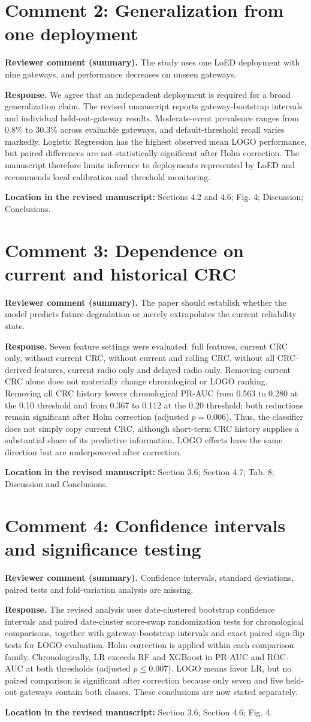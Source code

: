 \documentclass[11pt]{article}
\newcommand{\ReviewerComment}[1]{\par\noindent\textcolor{reviewblue}{\textbf{Reviewer comment (summary).}} #1\par}
\newcommand{\AuthorResponse}[1]{\par\noindent\textcolor{responsegreen}{\textbf{Response.}} #1\par}
\newcommand{\Location}[1]{\par\noindent\textbf{Location in the revised manuscript:} #1\par}
\begin{document}
\section*{Comment 2: Generalization from one deployment}
\ReviewerComment{The study uses one LoED deployment with nine gateways, and performance decreases on unseen gateways.}
\AuthorResponse{We agree that an independent deployment is required for a broad generalization claim. The revised manuscript reports gateway-bootstrap intervals and individual held-out-gateway results. Moderate-event prevalence ranges from 0.8\% to 30.3\% across evaluable gateways, and default-threshold recall varies markedly. Logistic Regression has the highest observed mean LOGO performance, but paired differences are not statistically significant after Holm correction. The manuscript therefore limits inference to deployments represented by LoED and recommends local calibration and threshold monitoring.}
\Location{Sections 4.2 and 4.6; Fig. 4; Discussion; Conclusions.}

\section*{Comment 3: Dependence on current and historical CRC}
\ReviewerComment{The paper should establish whether the model predicts future degradation or merely extrapolates the current reliability state.}
\AuthorResponse{Seven feature settings were evaluated: full features, current CRC only, without current CRC, without current and rolling CRC, without all CRC-derived features, current radio only and delayed radio only. Removing current CRC alone does not materially change chronological or LOGO ranking. Removing all CRC history lowers chronological PR-AUC from 0.563 to 0.280 at the 0.10 threshold and from 0.367 to 0.112 at the 0.20 threshold; both reductions remain significant after Holm correction (adjusted $p=0.006$). Thus, the classifier does not simply copy current CRC, although short-term CRC history supplies a substantial share of its predictive information. LOGO effects have the same direction but are underpowered after correction.}
\Location{Section 3.6; Section 4.7; Tab. 8; Discussion and Conclusions.}

\section*{Comment 4: Confidence intervals and significance testing}
\ReviewerComment{Confidence intervals, standard deviations, paired tests and fold-variation analysis are missing.}
\AuthorResponse{The revised analysis uses date-clustered bootstrap confidence intervals and paired date-cluster score-swap randomization tests for chronological comparisons, together with gateway-bootstrap intervals and exact paired sign-flip tests for LOGO evaluation. Holm correction is applied within each comparison family. Chronologically, LR exceeds RF and XGBoost in PR-AUC and ROC-AUC at both thresholds (adjusted $p\leq0.007$). LOGO means favor LR, but no paired comparison is significant after correction because only seven and five held-out gateways contain both classes. These conclusions are now stated separately.}
\Location{Section 3.6; Section 4.6; Fig. 4.}
\end{document}
